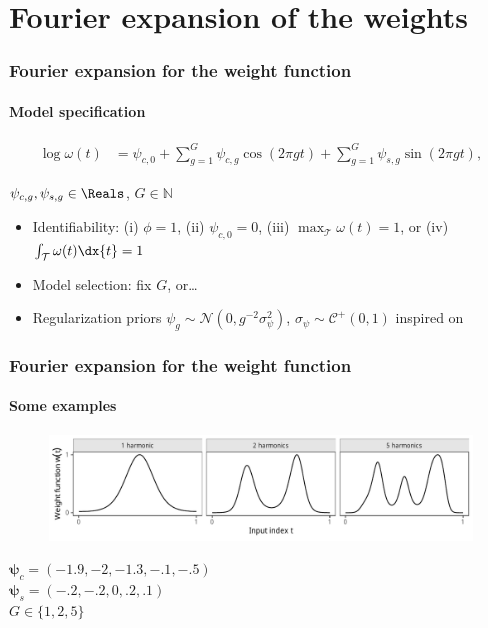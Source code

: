 \documentclass{snedecorbeamer}
\begin{document}
\section{Fourier expansion of the weights}

\begin{frame}
  \frametitle{Fourier expansion for the weight function}
  \framesubtitle{Model specification}

  \begin{align}
  \log\omega(t)
  \label{eq:few-log}
  &=\psi_{c,0} + \sum_{g = 1}^{G} \psi_{c,g}\cos\left(2\pi gt\right)
    + \sum_{g = 1}^{G} \psi_{s,g}\sin\left(2\pi gt\right),
  \end{align}

  \begin{center}
    $\psi_{c,g},\psi_{s,g}\in\Reals$, $G\in\mathbb{N}$
  \end{center}

  \vfill{}

  \begin{itemize}[<+(1)->]
  \item Identifiability: (i) $\phi = 1$, (ii) $\psi_{c,0} = 0$,
    (iii) $\max_\mathcal{T}\omega(t) = 1$, or (iv)
    $\int_\mathcal{T}\omega(t)\dx{t} = 1$
  \item Model selection: fix $G$, or\dots
  \item Regularization priors $\psi_g\sim\mathcal{N}(0,
    g^{-2}\sigma^2_\psi)$, $\sigma_\psi\sim\mathcal{C}^+(0, 1)$
    inspired on~\citep{carvalho2010}
  \end{itemize}
\end{frame}

\begin{frame}
  \frametitle{Fourier expansion for the weight function}
  \framesubtitle{Some examples
    \hyperlink{frm:FEW-G1-span}{}
  }

  \begin{figure}
    \centering
    \includegraphics[width=1\textwidth]{syn01-weight-span}
  \end{figure}

  \begin{center}
    $\bm{\psi}_{c} = (-1.9, -2, -1.3, -.1, -.5)$\\
    $\bm{\psi}_{s} = (-.2, -.2, 0, .2, .1)$\\
    $G\in\{1, 2, 5\}$
  \end{center}
\end{frame}
\end{document}
